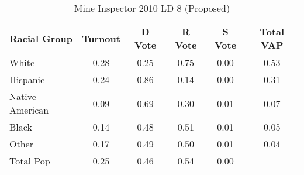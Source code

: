 \begin{table}[htb]
\begin{center}
\caption{Mine Inspector 2010 LD 8 (Proposed)}
\label{smine_vap_ld_8}
\begin{tabular}{lccccc}
  \hline
Racial Group & Turnout & D Vote & R Vote & S Vote & Total VAP \\ 
  \hline
White & 0.28 & 0.25 & 0.75 & 0.00 & 0.53 \\ 
  Hispanic & 0.24 & 0.86 & 0.14 & 0.00 & 0.31 \\ 
  Native American & 0.09 & 0.69 & 0.30 & 0.01 & 0.07 \\ 
  Black & 0.14 & 0.48 & 0.51 & 0.01 & 0.05 \\ 
  Other & 0.17 & 0.49 & 0.50 & 0.01 & 0.04 \\ 
  Total Pop & 0.25 & 0.46 & 0.54 & 0.00 &  \\ 
   \hline
\end{tabular}
\end{center}
\end{table}
